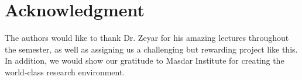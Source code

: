 \documentclass[12pt,journal,compsoc]{IEEEtran}
\begin{document}
  \section*{Acknowledgment}
\fi


The authors would like to thank Dr. Zeyar for his amazing lectures throughout the semester, as well as assigning us a challenging but rewarding project like this. In addition, we would show our gratitude to Masdar Institute for creating the world-class research environment.


\ifCLASSOPTIONcaptionsoff
  \newpage
\fi








%



%
\end{document}
